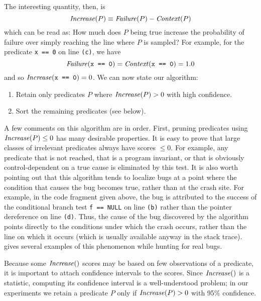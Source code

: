 The interesting quantity, then, is
\begin{equation*}
 \mbox{\textit{Increase}}(P) \equiv \mbox{\textit{Failure}}(P) - \mbox{\textit{Context}}(P) \label{eqn:1}
\end{equation*}
which can be read as: How much does $P$ being true increase the probability of failure
over simply reaching the line where $P$ is sampled?  For example, for the predicate {\tt x == 0} on line {\tt (c)},
we have
\[\mbox{\textit{Failure}}(\mbox{\tt x == 0}) = \mbox{\textit{Context}}(\mbox{\tt x == 0}) = 1.0 \]
and so $\mbox{\textit{Increase}}(\mbox{\tt x == 0}) = 0$.
We can now state our algorithm:
\begin{enumerate}
\item Retain only predicates $P$ where $\mbox{\textit{Increase}}(P) > 0$ with high confidence.

\item Sort the remaining predicates (see below).
\end{enumerate}

A few comments on this algorithm are in order.  First, pruning
predicates using $\mbox{\textit{Increase}}(P) \leq 0$ has many desirable
properties.  It is easy to prove that large classes of irrelevant
predicates always have scores $\leq 0$.  For example, any predicate
that is not reached, that is a program invariant, or that is obviously
control-dependent on a true cause is eliminated by this test.  It is
also worth pointing out that this algorithm tends to localize bugs at
a point where the condition that causes the bug becomes true, rather than at
the crash site.  For example, in the code fragment given above, the bug is
attributed to the success of the conditional branch test {\tt f ==
NULL} on line {\tt (b)} rather than the pointer dereference on line
{\tt (d)}.  Thus, the cause of the bug discovered by the algorithm
points directly to the conditions under which the crash occurs, rather than
the line on which it occurs (which is usually available anyway in the
stack trace).  gives several examples
of this phenomenon while hunting for real bugs.

Because some $\mbox{\textit{Increase}}()$ scores may be based on few observations of a predicate, it is important
to attach confidence intervals to the scores.  Since $\mbox{\textit{Increase}}()$ is a statistic, computing
its confidence interval is a well-understood problem; in our experiments we retain a predicate $P$
only if $\mbox{\textit{Increase}}(P) > 0$ with 95\% confidence.

